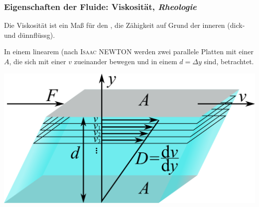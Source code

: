 
\begin{frame}
  \frametitle{Eigenschaften der Fluide: Viskosit\"at, \emph{Rheologie}}
  
  Die Viskosit\"at ist ein Ma\ss{} f\"ur den , die Z\"ahigkeit
  auf Grund der inneren  (dick- und d\"unnfl\"ussg).

  \parbox[c]{0.49\linewidth}{
    In einem linearem  (nach \textsc{Isaac NEWTON} werden zwei parallele 
    Platten mit einer  $A$,
    die sich mit einer  $v$ zueinander bewegen und 
    in einem  $d=\Delta y$ sind, betrachtet.
  }\parbox[c]{0.49\linewidth}{
      \includegraphics[width=\linewidth]{./ch01.basics/pics/Definition_Viskositaet}
  } 

  \ifteacher%
  \else%
    \vspace*{-0.0\baselineskip}\rotatebox[origin=lB]{180}{%
    \resizebox{0.9\linewidth}{!}{\parbox[t]{3.95\linewidth}{%
  Flie\ss{}widerstand, Reibung, Modell, Fl\"ache, Relativgeschwindigkeit, Abstand
    }}}
  \fi%
  

\end{frame}
